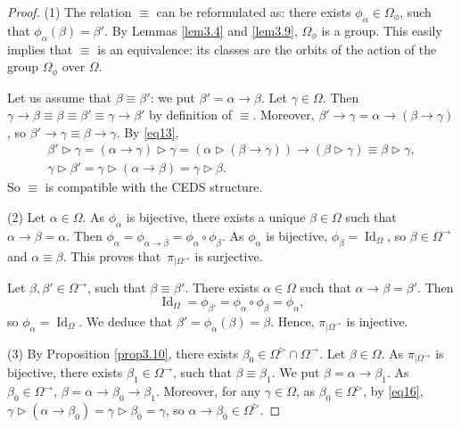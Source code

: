 \documentclass[pdftex]{sigma}
\numberwithin{equation}{section}
\begin{document}
\begin{proof}
(1) The relation $\equiv$ can be reformulated as: there exists $\phi_\alpha\in \Omega_\phi$, such that $\phi_\alpha(\beta)=\beta'$. By Lemmas \ref{lem3.4} and \ref{lem3.9}, $\Omega_\phi$ is a group.
This easily implies that $\equiv$ is an equivalence: its classes are the orbits of the action of the group $\Omega_\phi$ over $\Omega$.

Let us assume that $\beta \equiv \beta'$: we put $\beta'=\alpha\rightarrow \beta$. Let $\gamma \in \Omega$. Then $\gamma \rightarrow \beta\equiv \beta\equiv \beta'\equiv \gamma \rightarrow \beta'$ by definition of $\equiv$.
Moreover, $\beta' \rightarrow \gamma=\alpha \rightarrow (\beta \rightarrow \gamma)$, so $\beta'\rightarrow \gamma\equiv \beta \rightarrow \gamma$. By \eqref{eq13},
\begin{gather*}
\beta'\triangleright \gamma=(\alpha \rightarrow \gamma)\triangleright \gamma=(\alpha \triangleright (\beta \rightarrow \gamma))\rightarrow (\beta \triangleright \gamma)\equiv \beta \triangleright \gamma,\\
\gamma \triangleright \beta'=\gamma \triangleright(\alpha \rightarrow \beta)=\gamma \triangleright \beta.
\end{gather*}
So $\equiv$ is compatible with the CEDS structure.

(2) Let $\alpha \in \Omega$. As $\phi_\alpha$ is bijective, there exists a unique $\beta \in \Omega$ such that $\alpha \rightarrow \beta=\alpha$. Then
$\phi_\alpha=\phi_{\alpha \rightarrow \beta}=\phi_\alpha\circ \phi_\beta$.
As $\phi_\alpha$ is bijective, $\phi_\beta=\operatorname{Id}_\Omega$, so $\beta \in \Omega^\rightarrow$ and $\alpha \equiv \beta$. This proves that~$\pi_{\mid \Omega^\rightarrow}$ is surjective.

Let $\beta,\beta'\in \Omega^\rightarrow$, such that $\beta\equiv \beta'$. There exists $\alpha\in \Omega$ such that $\alpha\rightarrow\beta=\beta'$. Then
\[\operatorname{Id}_\Omega=\phi_{\beta'}=\phi_{\alpha}\circ \phi_{\beta}=\phi_\alpha,\]
so $\phi_\alpha=\operatorname{Id}_\Omega$. We deduce that $\beta'=\phi_\alpha(\beta)=\beta$. Hence, $\pi_{\mid \Omega^\rightarrow}$ is injective.

(3) By Proposition \ref{prop3.10}, there exists $\beta_0\in \Omega^\triangleright \cap \Omega^\rightarrow$.
Let $\beta \in \Omega$. As $\pi_{\mid \Omega^\rightarrow}$ is bijective, there exists $\beta_1\in \Omega^\rightarrow$, such that $\beta\equiv \beta_1$. We put $\beta=\alpha \rightarrow \beta_1$. As $\beta_0\in \Omega^\rightarrow$,
$\beta=\alpha \rightarrow {\beta_0\rightarrow \beta_1}$. Moreover, for any $\gamma \in \Omega$, as $\beta_0\in \Omega^\triangleright$, by \eqref{eq16},
$\gamma \triangleright (\alpha \rightarrow \beta_0)=\gamma \triangleright \beta_0=\gamma$,
so $\alpha \rightarrow \beta_0\in \Omega^\triangleright$. \end{proof}
\end{document}
